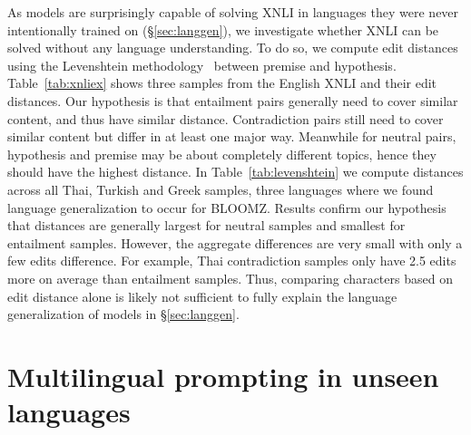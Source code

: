 \documentclass[11pt]{article}
\begin{document}
As models are surprisingly capable of solving XNLI in languages they were never intentionally trained on (\S\ref{sec:langgen}), we investigate whether XNLI can be solved without any language understanding. To do so, we compute edit distances using the Levenshtein methodology~\cite{levenshtein1966binary} between premise and hypothesis. Table~\ref{tab:xnliex} shows three samples from the English XNLI and their edit distances. Our hypothesis is that entailment pairs generally need to cover similar content, and thus have similar distance. Contradiction pairs still need to cover similar content but differ in at least one major way. Meanwhile for neutral pairs, hypothesis and premise may be about completely different topics, hence they should have the highest distance. In Table~\ref{tab:levenshtein} we compute distances across all Thai, Turkish and Greek samples, three languages where we found language generalization to occur for BLOOMZ. Results confirm our hypothesis that distances are generally largest for neutral samples and smallest for entailment samples. However, the aggregate differences are very small with only a few edits difference. For example, Thai contradiction samples only have 2.5 edits more on average than entailment samples. Thus, comparing characters based on edit distance alone is likely not sufficient to fully explain the language generalization of models in \S\ref{sec:langgen}.

\begin{table}[h]
    \small
    \begin{center}
    \caption{Levenshtein distances between hypothesis and premise averaged across samples from different XNLI labels. Each label has 830 samples per language subset.}
    \label{tab:levenshtein}
    \end{center}
\end{table}

\FloatBarrier

\section{Multilingual prompting in unseen languages}
\label{sec:multiunseen}
\end{document}
